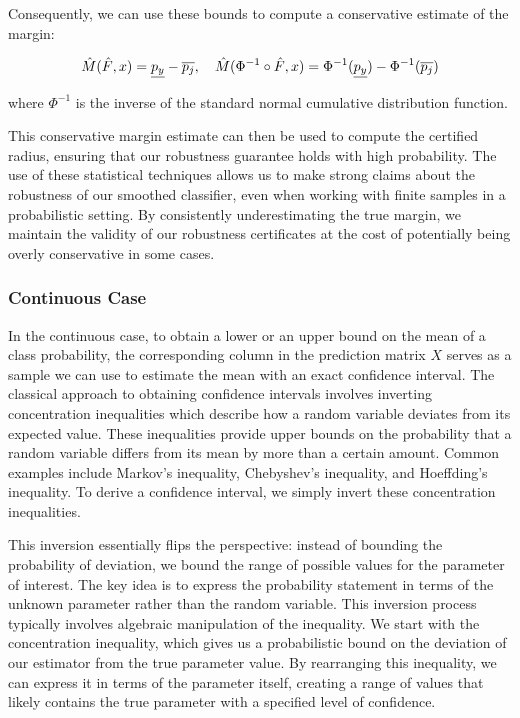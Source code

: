 Consequently, we can use these bounds to compute a conservative estimate of the margin:

\begin{equation}
    \Hat{M}(\Hat{F},x)= \underline{p_y} - \overline{p_j}, \quad\Hat{M}(\Phi^{-1}\circ\Hat{F},x) = \Phi^{-1}(\underline{p_y}) - \Phi^{-1}(\overline{p_j})\label{eq:clopper-pearson}
\end{equation}

where $\Phi^{-1}$ is the inverse of the standard normal cumulative distribution function.

This conservative margin estimate can then be used to compute the certified radius, ensuring that our robustness guarantee holds with high probability.
The use of these statistical techniques allows us to make strong claims about the robustness of our smoothed classifier, even when working with finite samples in a probabilistic setting.
By consistently underestimating the true margin, we maintain the validity of our robustness certificates at the cost of potentially being overly conservative in some cases.

\subsubsection{Continuous Case}\label{subsubsec:continuous-case}
In the continuous case, to obtain a lower or an upper bound on the mean of a class probability, the corresponding column in the prediction matrix $X$ serves as a sample we can use to estimate the mean with an exact confidence interval.
The classical approach to obtaining confidence intervals involves inverting concentration inequalities which describe how a random variable deviates from its expected value.
These inequalities provide upper bounds on the probability that a random variable differs from its mean by more than a certain amount.
Common examples include Markov's inequality, Chebyshev's inequality, and Hoeffding's inequality.
To derive a confidence interval, we simply invert these concentration inequalities.

This inversion essentially flips the perspective: instead of bounding the probability of deviation, we bound the range of possible values for the parameter of interest.
The key idea is to express the probability statement in terms of the unknown parameter rather than the random variable.
This inversion process typically involves algebraic manipulation of the inequality.
We start with the concentration inequality, which gives us a probabilistic bound on the deviation of our estimator from the true parameter value.
By rearranging this inequality, we can express it in terms of the parameter itself, creating a range of values that likely contains the true parameter with a specified level of confidence.

